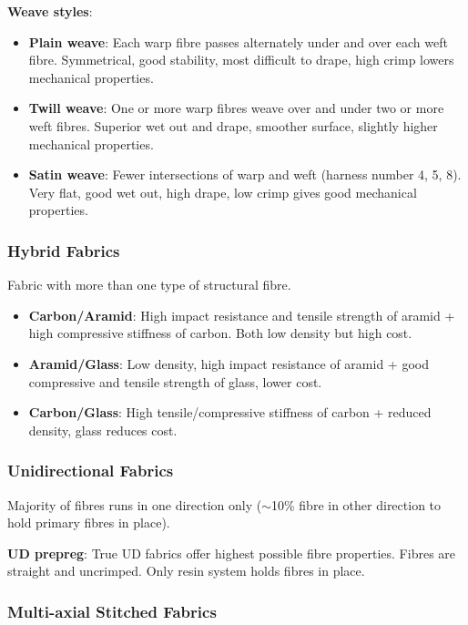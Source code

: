 \documentclass{NoteThesis/note-thesis}
\begin{document}
\textbf{Weave styles}:
\begin{itemize}
    \item \textbf{Plain weave}: Each warp fibre passes alternately under and over each weft fibre. Symmetrical, good stability, most difficult to drape, high crimp lowers mechanical properties.
    \item \textbf{Twill weave}: One or more warp fibres weave over and under two or more weft fibres. Superior wet out and drape, smoother surface, slightly higher mechanical properties.
    \item \textbf{Satin weave}: Fewer intersections of warp and weft (harness number 4, 5, 8). Very flat, good wet out, high drape, low crimp gives good mechanical properties.
\end{itemize}

\subsubsection*{Hybrid Fabrics}

Fabric with more than one type of structural fibre.

\begin{itemize}
    \item \textbf{Carbon/Aramid}: High impact resistance and tensile strength of aramid + high compressive stiffness of carbon. Both low density but high cost.
    \item \textbf{Aramid/Glass}: Low density, high impact resistance of aramid + good compressive and tensile strength of glass, lower cost.
    \item \textbf{Carbon/Glass}: High tensile/compressive stiffness of carbon + reduced density, glass reduces cost.
\end{itemize}

\subsubsection*{Unidirectional Fabrics}

Majority of fibres runs in one direction only ($\sim$10\% fibre in other direction to hold primary fibres in place).

\textbf{UD prepreg}: True UD fabrics offer highest possible fibre properties. Fibres are straight and uncrimped. Only resin system holds fibres in place.

\subsubsection*{Multi-axial Stitched Fabrics}
\end{document}
